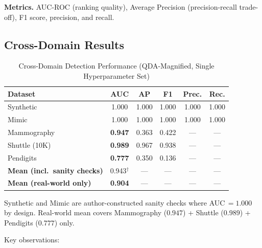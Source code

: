 \documentclass[journal]{IEEEtran}
\begin{document}
\textbf{Metrics.} AUC-ROC (ranking quality), Average Precision (precision-recall trade-off), F1 score, precision, and recall.

\subsection{Cross-Domain Results}
\label{ssec:results}

\begin{table}[!t]
\centering
\caption{Cross-Domain Detection Performance (QDA-Magnified, Single Hyperparameter Set)}
\label{tab:results}
\begin{threeparttable}
\begin{tabular}{@{}lccccc@{}}
\toprule
\textbf{Dataset} & \textbf{AUC} & \textbf{AP} & \textbf{F1} & \textbf{Prec.} & \textbf{Rec.} \\
\midrule
Synthetic & 1.000 & 1.000 & 1.000 & 1.000 & 1.000 \\
Mimic & 1.000 & 1.000 & 1.000 & 1.000 & 1.000 \\
Mammography & \textbf{0.947} & 0.363 & 0.422 & --- & --- \\
Shuttle (10K) & \textbf{0.989} & 0.967 & 0.938 & --- & --- \\
Pendigits & \textbf{0.777} & 0.350 & 0.136 & --- & --- \\
\midrule
\textbf{Mean (incl.~sanity checks)} & 0.943$^\dagger$ & --- & --- & --- & --- \\
\textbf{Mean (real-world only)} & \textbf{0.904} & --- & --- & --- & --- \\
\bottomrule
\end{tabular}
\begin{tablenotes}\small
  \item[$\dagger$] Synthetic and Mimic are author-constructed sanity checks where AUC$\,{=}1.000$ by design.
  Real-world mean covers Mammography ($0.947$) + Shuttle ($0.989$) + Pendigits ($0.777$) only.
\end{tablenotes}
\end{threeparttable}
\end{table}

Key observations:
\end{document}
